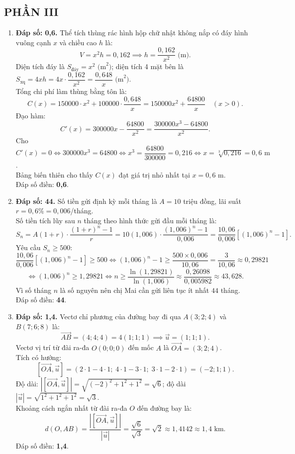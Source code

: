 \documentclass[12pt,a4paper]{article}
\begin{document}
\subsection*{PHẦN III}
\begin{enumerate}[label=\textbf{Câu \arabic*:}, leftmargin=*]
\item \textbf{Đáp số: 0,6.}
Thể tích thùng rác hình hộp chữ nhật không nắp có đáy hình vuông cạnh $x$ và chiều cao $h$ là:
$$V = x^2 h = 0{,}162 \implies h = \dfrac{0{,}162}{x^2}\text{ (m)}.$$
Diện tích đáy là $S_{\text{đáy}} = x^2\text{ (m}^2\text{)}$; diện tích 4 mặt bên là $S_{\text{xq}} = 4xh = 4x \cdot \dfrac{0{,}162}{x^2} = \dfrac{0{,}648}{x}\text{ (m}^2\text{)}$.\\
Tổng chi phí làm thùng bằng tôn là:
$$C(x) = 150000 \cdot x^2 + 100000 \cdot \dfrac{0{,}648}{x} = 150000x^2 + \dfrac{64800}{x}\quad (x > 0).$$
Đạo hàm:
$$C'(x) = 300000x - \dfrac{64800}{x^2} = \dfrac{300000x^3 - 64800}{x^2}.$$
Cho $C'(x) = 0 \iff 300000x^3 = 64800 \iff x^3 = \dfrac{64800}{300000} = 0{,}216 \iff x = \sqrt[3]{0{,}216} = 0{,}6\text{ m}$.\\
Bảng biến thiên cho thấy $C(x)$ đạt giá trị nhỏ nhất tại $x = 0{,}6\text{ m}$.\\
Đáp số điền: \textbf{0,6}.

\item \textbf{Đáp số: 44.}
Số tiền gửi định kỳ mỗi tháng là $A = 10$ triệu đồng, lãi suất $r = 0{,}6\% = 0{,}006$/tháng.\\
Số tiền tích lũy sau $n$ tháng theo hình thức gửi đầu mỗi tháng là:
$$S_n = A(1 + r) \cdot \dfrac{(1 + r)^n - 1}{r} = 10(1{,}006) \cdot \dfrac{(1{,}006)^n - 1}{0{,}006} = \dfrac{10{,}06}{0{,}006} \left[(1{,}006)^n - 1\right].$$
Yêu cầu $S_n \ge 500$:
$$\dfrac{10{,}06}{0{,}006} \left[(1{,}006)^n - 1\right] \ge 500 \iff (1{,}006)^n - 1 \ge \dfrac{500 \times 0{,}006}{10{,}06} = \dfrac{3}{10{,}06} \approx 0{,}29821$$
$$\iff (1{,}006)^n \ge 1{,}29821 \iff n \ge \dfrac{\ln(1{,}29821)}{\ln(1{,}006)} \approx \dfrac{0{,}26098}{0{,}005982} \approx 43{,}628.$$
Vì số tháng $n$ là số nguyên nên chị Mai cần gửi liên tục ít nhất $44$ tháng.\\
Đáp số điền: \textbf{44}.

\item \textbf{Đáp số: 1,4.}
Vectơ chỉ phương của đường bay đi qua $A(3; 2; 4)$ và $B(7; 6; 8)$ là:
$$\overrightarrow{AB} = (4; 4; 4) = 4(1; 1; 1) \implies \vec{u} = (1; 1; 1).$$
Vectơ vị trí từ đài ra-đa $O(0; 0; 0)$ đến mốc $A$ là $\overrightarrow{OA} = (3; 2; 4)$.\\
Tích có hướng:
$$\left[ \overrightarrow{OA}, \vec{u} \right] = (2 \cdot 1 - 4 \cdot 1;\; 4 \cdot 1 - 3 \cdot 1;\; 3 \cdot 1 - 2 \cdot 1) = (-2; 1; 1).$$
Độ dài: $\left| \left[ \overrightarrow{OA}, \vec{u} \right] \right| = \sqrt{(-2)^2 + 1^2 + 1^2} = \sqrt{6}$; độ dài $|\vec{u}| = \sqrt{1^2 + 1^2 + 1^2} = \sqrt{3}$.\\
Khoảng cách ngắn nhất từ đài ra-đa $O$ đến đường bay là:
$$d(O, AB) = \dfrac{\left| \left[ \overrightarrow{OA}, \vec{u} \right] \right|}{|\vec{u}|} = \dfrac{\sqrt{6}}{\sqrt{3}} = \sqrt{2} \approx 1{,}4142 \approx 1{,}4\text{ km}.$$
Đáp số điền: \textbf{1,4}.


\end{enumerate}
\end{document}
